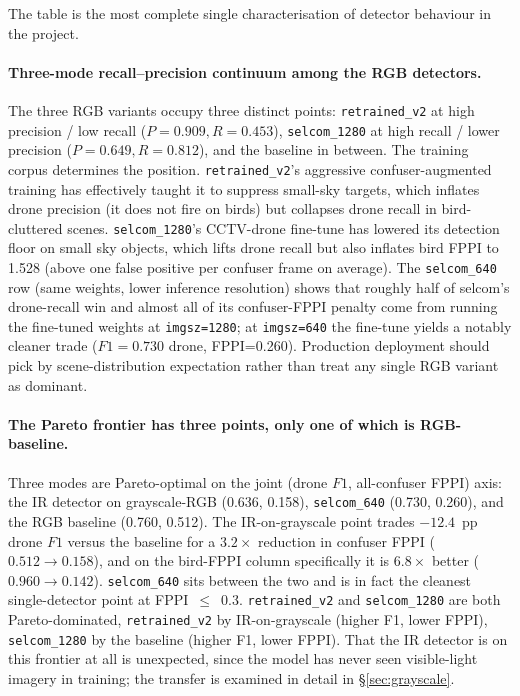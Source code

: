 \documentclass[12pt,a4paper,oneside,openright]{book}
\begin{document}
The table is the most complete single characterisation of detector behaviour in the project.

\paragraph{Three-mode recall--precision continuum among the RGB detectors.}
The three RGB variants occupy three distinct points: \texttt{retrained\_v2} at high precision / low recall ($P=0.909, R=0.453$), \texttt{selcom\_1280} at high recall / lower precision ($P=0.649, R=0.812$), and the baseline in between. The training corpus determines the position. \texttt{retrained\_v2}'s aggressive confuser-augmented training has effectively taught it to suppress small-sky targets, which inflates drone precision (it does not fire on birds) but collapses drone recall in bird-cluttered scenes. \texttt{selcom\_1280}'s CCTV-drone fine-tune has lowered its detection floor on small sky objects, which lifts drone recall but also inflates bird FPPI to 1.528 (above one false positive per confuser frame on average). The \texttt{selcom\_640} row (same weights, lower inference resolution) shows that roughly half of selcom's drone-recall win and almost all of its confuser-FPPI penalty come from running the fine-tuned weights at \texttt{imgsz=1280}; at \texttt{imgsz=640} the fine-tune yields a notably cleaner trade ($F1=0.730$ drone, FPPI=0.260). Production deployment should pick by scene-distribution expectation rather than treat any single RGB variant as dominant.

\paragraph{The Pareto frontier has three points, only one of which is RGB-baseline.}
Three modes are Pareto-optimal on the joint (drone $F1$, all-confuser FPPI) axis: the IR detector on grayscale-RGB (0.636, 0.158), \texttt{selcom\_640} (0.730, 0.260), and the RGB baseline (0.760, 0.512). The IR-on-grayscale point trades $-12.4$~pp drone $F1$ versus the baseline for a $3.2\times$ reduction in confuser FPPI ($0.512 \to 0.158$), and on the bird-FPPI column specifically it is $6.8\times$ better ($0.960 \to 0.142$). \texttt{selcom\_640} sits between the two and is in fact the cleanest single-detector point at FPPI~$\leq$~0.3. \texttt{retrained\_v2} and \texttt{selcom\_1280} are both Pareto-dominated, \texttt{retrained\_v2} by IR-on-grayscale (higher F1, lower FPPI), \texttt{selcom\_1280} by the baseline (higher F1, lower FPPI). That the IR detector is on this frontier at all is unexpected, since the model has never seen visible-light imagery in training; the transfer is examined in detail in \S\ref{sec:grayscale}.
\end{document}
